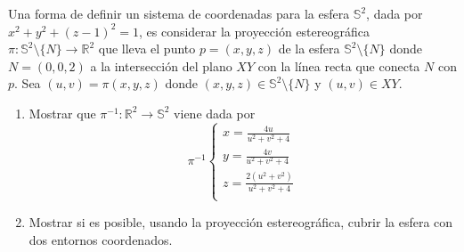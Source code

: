 \begin{ejr}[5]
  Una forma de definir un sistema de coordenadas para la esfera $\mathbb{S}^{2}$, dada por $x^{2} + y^{2} + (z - 1)^{2} = 1$, es considerar la proyección estereográfica $\pi : \mathbb{S}^{2} \setminus \{ N \} \to \mathbb{R}^{2}$ que lleva el punto $p = (x, y, z)$ de la esfera $\mathbb{S}^{2} \setminus \{ N \}$ donde $N = (0, 0, 2)$ a la intersección del plano $XY$ con la línea recta que conecta $N$ con $p$. Sea $(u, v) = \pi (x, y, z)$ donde $(x, y, z) \in \mathbb{S}^{2} \setminus \{ N \}$ y $(u, v) \in XY$.
  \begin{enumerate}[label=(\roman*)]
    \item Mostrar que $\pi ^{-1} : \mathbb{R}^{2} \to \mathbb{S}^{2}$ viene dada por
      \[ 
        \pi^{-1}
        \begin{cases}
          x = \frac{4u}{u^{2} + v^{2} + 4} \\
          y = \frac{4v}{u^{2} + v^{2} + 4} \\
          z = \frac{2(u^{2} + v^{2})}{u^{2} + v^{2} + 4} \\
        \end{cases} 
      \] 
    \item Mostrar si es posible, usando la proyección estereográfica, cubrir la esfera con dos entornos coordenados.
  \end{enumerate}
\end{ejr}

